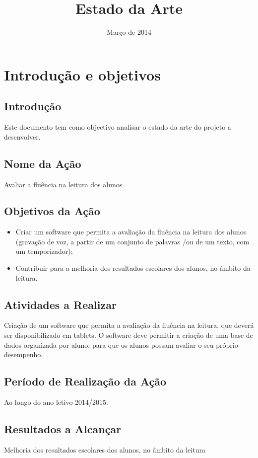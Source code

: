 \documentclass[a4paper,titlepage]{article}
\title{Estado da Arte}
\date{Março de 2014}
\begin{document}
	\maketitle
	
	\newpage
	
	\tableofcontents
	
	\newpage
	
	\section{Introdução e objetivos}
		
	\subsection{Introdução}	
	Este documento tem como objectivo analisar o estado da arte do projeto a desenvolver.
	
	\subsection{Nome da Ação}
		Avaliar a fluência na leitura dos alunos
	\subsection{Objetivos da Ação}
		\begin{itemize}
			\item Criar um software que permita a avaliação da fluência na leitura dos alunos (gravação de voz, a partir de um conjunto de palavras /ou de um texto, com um temporizador);
			\item Contribuir para a melhoria dos resultados escolares dos alunos, no âmbito da leitura.
		\end{itemize}
	\subsection{Atividades a Realizar}
	Criação de um software que permita a avaliação da fluência na leitura, que deverá ser disponibilizado em tablets. O software deve permitir a criação de uma base de dados organizada por aluno, para que os alunos possam avaliar o seu próprio desempenho.
		\subsection{Período de Realização da Ação}
			Ao longo do ano letivo 2014/2015.
		\subsection{Resultados a Alcançar}
		Melhoria dos resultados escolares dos alunos, no âmbito da leitura
		
\end{document}
